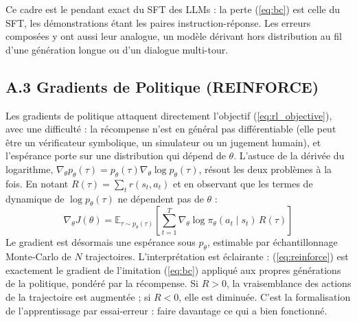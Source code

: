 \documentclass[11pt,a4paper]{article}
\begin{document}
Ce cadre est le pendant exact du SFT des LLMs : la perte (\ref{eq:bc}) est celle du SFT, les démonstrations étant les paires instruction-réponse. Les erreurs composées y ont aussi leur analogue, un modèle dérivant hors distribution au fil d'une génération longue ou d'un dialogue multi-tour.

\subsection*{A.3 Gradients de Politique (REINFORCE)}
Les gradients de politique attaquent directement l'objectif (\ref{eq:rl_objective}), avec une difficulté : la récompense n'est en général pas différentiable (elle peut être un vérificateur symbolique, un simulateur ou un jugement humain), et l'espérance porte sur une distribution qui dépend de $\theta$. L'astuce de la dérivée du logarithme, $\nabla_\theta p_\theta(\tau) = p_\theta(\tau) \nabla_\theta \log p_\theta(\tau)$, résout les deux problèmes à la fois. En notant $R(\tau) = \sum_t r(s_t, a_t)$ et en observant que les termes de dynamique de $\log p_\theta(\tau)$ ne dépendent pas de $\theta$ :
\begin{equation}
\nabla_\theta J(\theta) = \mathbb{E}_{\tau \sim p_\theta(\tau)} \left[ \sum_{t=1}^{T} \nabla_\theta \log \pi_\theta(a_t \mid s_t) \, R(\tau) \right]
\label{eq:reinforce}
\end{equation}
Le gradient est désormais une espérance sous $p_\theta$, estimable par échantillonnage Monte-Carlo de $N$ trajectoires. L'interprétation est éclairante : (\ref{eq:reinforce}) est exactement le gradient de l'imitation (\ref{eq:bc}) appliqué aux propres générations de la politique, pondéré par la récompense. Si $R > 0$, la vraisemblance des actions de la trajectoire est augmentée ; si $R < 0$, elle est diminuée. C'est la formalisation de l'apprentissage par essai-erreur : faire davantage ce qui a bien fonctionné.
\end{document}

